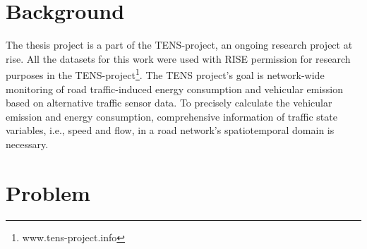 \documentclass[english]{kththesis}
\begin{document}
\section{Background}
\label{sec:background}
\renewcommand{\thefootnote}{\arabic{footnote}}
The thesis project is a part of the TENS-project, an ongoing research project at \gls{rise}. All the datasets for this work were used with RISE permission for research purposes in the TENS-project\footnote{www.tens-project.info}. The TENS project's goal is network-wide monitoring of road traffic-induced energy consumption and vehicular emission based on alternative traffic sensor data. To precisely calculate the vehicular emission and energy consumption, comprehensive information of traffic state variables, i.e., speed and flow, in a road network's spatiotemporal domain is necessary.

\section{Problem}
\end{document}

